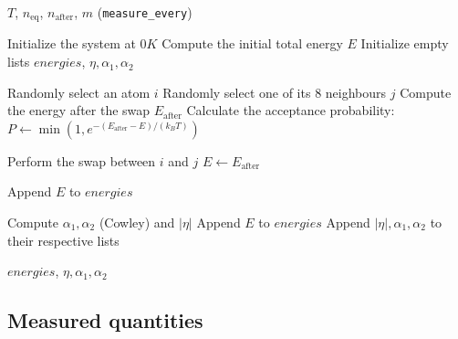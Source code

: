 \documentclass[11pt,a4paper]{article}
\newcommand{\A}[1]{\textcolor{colA}{#1}}
\newcommand{\B}[1]{\textcolor{colB}{#1}}
\begin{document}
\begin{algorithm}[ht!]
\caption{Metropolis. The black lines are common to both versions of the run: the blue lines are the measurement run (quantities recorded every $m$ steps after equilibration), the orange line is the equilibration study (energy recorded after every step).}
\label{alg:metropolis}
\begin{algorithmic}[1]

\Require $T$, $n_{\mathrm{eq}}$, \A{$n_{\mathrm{after}}$, $m$ (\texttt{measure\_every})}

\State Initialize the system at $0K$
\State Compute the initial total energy $E$
\State Initialize empty lists $energies$\A{, $\eta,\alpha_1,\alpha_2$}

\For{$k=0$ to $n_{\mathrm{eq}}$\A{$+\,n_{\mathrm{after}}$}$-1$}

    \State Randomly select an atom $i$
    \State Randomly select one of its 8 neighbours $j$
    \State Compute the energy after the swap $E_{\mathrm{after}}$
    \State Calculate the acceptance probability:
    $P \gets \min\left(1,e^{-(E_{\mathrm{after}}-E)/(k_BT)}\right)$

        \State Perform the swap between $i$ and $j$
        \State $E \gets E_{\mathrm{after}}$
    \EndIf

    \State \B{Append $E$ to $energies$}

        \State \A{Compute $\alpha_1,\alpha_2$ (Cowley) and $|\eta|$}
        \State \A{Append $E$ to $energies$}
        \State \A{Append $|\eta|,\alpha_1,\alpha_2$ to their respective lists}
    \EndIfA

\EndFor

\State \Return $energies$\A{, $\eta,\alpha_1,\alpha_2$}

\end{algorithmic}
\end{algorithm}

\subsection{Measured quantities}
\label{sec:measured}
\end{document}
